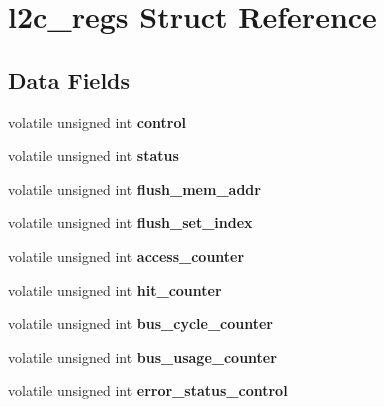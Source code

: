 \hypertarget{structl2c__regs}{}\section{l2c\+\_\+regs Struct Reference}
\label{structl2c__regs}
\subsection*{Data Fields}
\begin{DoxyCompactItemize}
\item 
\mbox{\label{structl2c__regs_a7ad3cdf3b31f0ad962f5659acabd0b23}} 
volatile unsigned int {\bfseries control}
\item 
\mbox{\label{structl2c__regs_a30e6811171127d51799d003d437f0a7a}} 
volatile unsigned int {\bfseries status}
\item 
\mbox{\label{structl2c__regs_a69bec4e7db0b2559e2b76e77dfd44870}} 
volatile unsigned int {\bfseries flush\+\_\+mem\+\_\+addr}
\item 
\mbox{\label{structl2c__regs_a1ac5fa10a02bdd971798f338e8ab8540}} 
volatile unsigned int {\bfseries flush\+\_\+set\+\_\+index}
\item 
\mbox{\label{structl2c__regs_ad2c770e0933310f367e555d318595c55}} 
volatile unsigned int {\bfseries access\+\_\+counter}
\item 
\mbox{\label{structl2c__regs_ad58f5faf1c9ad6ba5857c6755d04c132}} 
volatile unsigned int {\bfseries hit\+\_\+counter}
\item 
\mbox{\label{structl2c__regs_aa851929f0ee80bfd4f26a0ac23124f52}} 
volatile unsigned int {\bfseries bus\+\_\+cycle\+\_\+counter}
\item 
\mbox{\label{structl2c__regs_ad6a4bd10640f5d6fa2181241ba26b826}} 
volatile unsigned int {\bfseries bus\+\_\+usage\+\_\+counter}
\item 
\mbox{\label{structl2c__regs_a5c007df7bc3cfe2643c6d17714a90a17}} 
volatile unsigned int {\bfseries error\+\_\+status\+\_\+control}

\end{DoxyCompactItemize}
